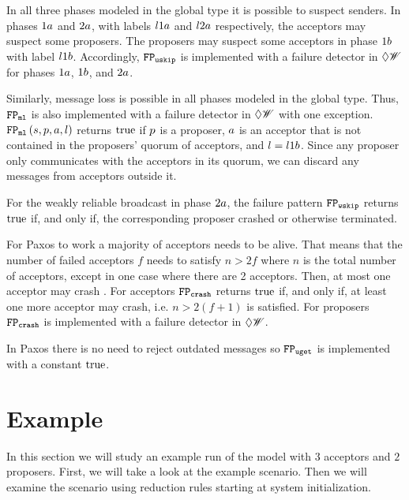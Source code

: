 In all three phases modeled in the global type it is possible to suspect senders.
In phases $1a$ and $2a$, with labels $l1a$ and $l2a$ respectively, the acceptors may suspect some proposers.
The proposers may suspect some acceptors in phase $1b$ with label $l1b$.
Accordingly, $\mathtt{FP_{uskip}}$ is implemented with a failure detector in $\Diamond\mathscr{W}$ for phases $1a$, $1b$, and $2a$.

Similarly, message loss is possible in all phases modeled in the global type.
Thus, $\mathtt{FP_{ml}}$ is also implemented with a failure detector in $\Diamond\mathscr{W}$ with one exception.
$\mathtt{FP_{ml}}\left(s,p,a,l\right)$ returns $\operatorname{true}$ if $p$ is a proposer, $a$ is an acceptor that is not contained in the proposers' quorum of acceptors, and $l = l1b$.
Since any proposer only communicates with the acceptors in its quorum, we can discard any messages from acceptors outside it.

For the weakly reliable broadcast in phase $2a$, the failure pattern $\mathtt{FP_{wskip}}$ returns $\operatorname{true}$ if, and only if, the corresponding proposer crashed or otherwise terminated.

For Paxos to work a majority of acceptors needs to be alive.
That means that the number of failed acceptors $f$ needs to satisfy $n > 2f$ where $n$ is the total number of acceptors, except in one case where there are 2 acceptors.
Then, at most one acceptor may crash \cite{lower_bounds}.
For acceptors $\mathtt{FP_{crash}}$ returns $\operatorname{true}$ if, and only if, at least one more acceptor may crash, i.e. $n > 2(f + 1)$ is satisfied.
For proposers $\mathtt{FP_{crash}}$ is implemented with a failure detector in $\Diamond\mathscr{W}$.

In Paxos there is no need to reject outdated messages so $\mathtt{FP_{uget}}$ is implemented with a constant $\operatorname{true}$.


\section{Example}
In this section we will study an example run of the model with $3$ acceptors and $2$ proposers.
First, we will take a look at the example scenario.
Then we will examine the scenario using reduction rules starting at system initialization.

